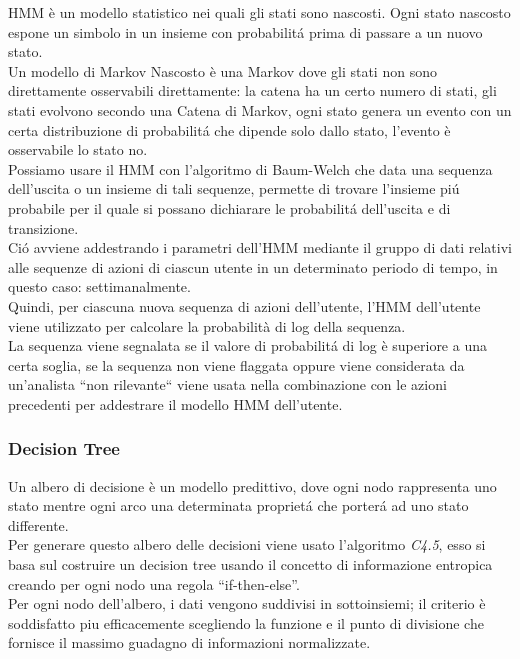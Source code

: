 \documentclass[../tesi.tex]{subfiles}
\begin{document}
HMM è un modello statistico nei quali gli stati sono nascosti. Ogni stato nascosto espone un simbolo in un insieme con probabilitá prima di passare a un nuovo stato.\\
Un modello di Markov Nascosto è una \Gls{Markov} dove gli stati non sono direttamente osservabili direttamente: la catena ha un certo numero di stati, gli stati evolvono secondo una Catena di Markov, ogni stato genera un evento con un certa distribuzione di probabilitá che dipende solo dallo stato, l’evento è osservabile lo stato no.\\
Possiamo usare il HMM con l’algoritmo di Baum-Welch che data una sequenza dell’uscita o un insieme di tali sequenze, permette di trovare l’insieme piú probabile per il quale si possano dichiarare le probabilitá dell’uscita e di transizione.\\
Ció avviene addestrando i parametri dell’HMM mediante il gruppo di dati relativi alle sequenze di azioni di ciascun utente in un determinato periodo di tempo, in questo caso: settimanalmente.\\
Quindi, per ciascuna nuova sequenza di azioni dell'utente, l'HMM dell'utente viene utilizzato per calcolare la probabilità di log della sequenza.\\
La sequenza viene segnalata se il valore di probabilitá di log è superiore a una certa soglia, se la sequenza non viene flaggata oppure viene considerata da un'analista “non rilevante`` viene usata nella combinazione con le azioni precedenti per addestrare il modello HMM dell’utente.

\subsubsection{Decision Tree}

Un albero di decisione è un modello predittivo, dove ogni nodo rappresenta uno stato mentre ogni arco una determinata proprietá che porterá ad uno stato differente.\\
Per generare questo albero delle decisioni viene usato l’algoritmo \textit{C4.5}, esso si basa sul costruire un decision tree usando il concetto di informazione entropica creando per ogni nodo una regola “if-then-else”.\\
Per ogni nodo dell’albero, i dati vengono suddivisi in sottoinsiemi; il criterio è soddisfatto piu efficacemente scegliendo la funzione e il punto di divisione che fornisce il massimo guadagno di informazioni normalizzate.
\end{document}
